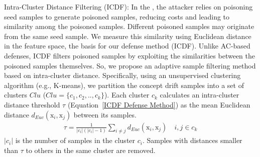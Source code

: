 Intra-Cluster Distance Filtering (ICDF): In the \pandora, the attacker relies on poisoning seed samples to generate poisoned samples, reducing costs and leading to similarity among the poisoned samples.
Different poisoned samples may originate from the same seed sample.
We measure this similarity using Euclidean distance in the feature space, the basis for our defense method (ICDF).
Unlike AC-based defenses, ICDF filters poisoned samples by exploiting the similarities between the poisoned samples themselves.
So, we propose an adaptive sample filtering method based on intra-cluster distance.
Specifically, using an unsupervised clustering algorithm (e.g., K-means), we partition the concept drift samples into a set of clusters $Clu$ ($Clu= \{c_{1},c_{2},..,c_{k} \}$).
Each cluster $c_{k}$ calculates an intra-cluster distance threshold $\tau$ (Equation~\ref{ICDF Defense Method}) as the mean Euclidean distance $d_{Euc}(\bm{\mathrm{x}}_{i}, \bm{\mathrm{x}}_{j})$ between its samples.
\begin{equation}
	\begin{aligned}
		\tau = \frac{1}{|c_{i}| (|c_{i}| - 1)} \sum_{i \neq j} d_{Euc}(\bm{\mathrm{x}}_{i}, \bm{\mathrm{x}}_{j}) \quad i,j \in c_{k}
	\end{aligned}
	\label{ICDF Defense Method}
\end{equation}
$|c_{i}|$ is the number of samples in the cluster $c_{i}$.
Samples with distances smaller than $\tau$ to others in the same cluster are removed.
